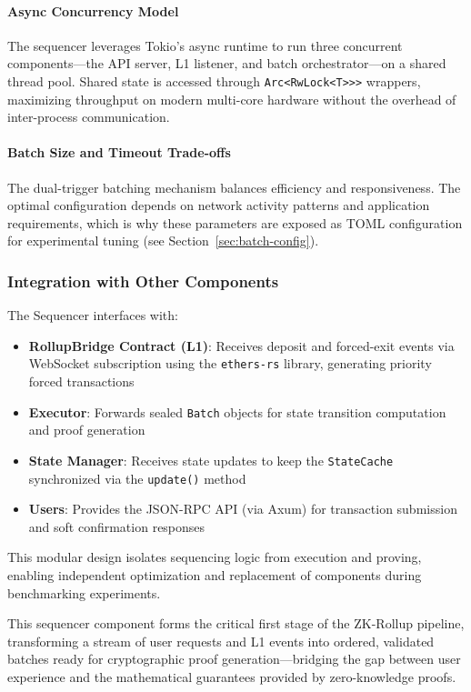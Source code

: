 \paragraph{Async Concurrency Model}

The sequencer leverages Tokio's async runtime to run three concurrent components---the API server, L1 listener, and batch orchestrator---on a shared thread pool. Shared state is accessed through \texttt{Arc<RwLock<T>{>}{>}} wrappers, maximizing throughput on modern multi-core hardware without the overhead of inter-process communication.

\paragraph{Batch Size and Timeout Trade-offs}

The dual-trigger batching mechanism balances efficiency and responsiveness. The optimal configuration depends on network activity patterns and application requirements, which is why these parameters are exposed as TOML configuration for experimental tuning (see Section~\ref{sec:batch-config}).

\subsubsection{Integration with Other Components}

The Sequencer interfaces with:

\begin{itemize}
    \item \textbf{RollupBridge Contract (L1)}: Receives deposit and forced-exit events via WebSocket subscription using the \texttt{ethers-rs} library, generating priority forced transactions
    \item \textbf{Executor}: Forwards sealed \texttt{Batch} objects for state transition computation and proof generation
    \item \textbf{State Manager}: Receives state updates to keep the \texttt{StateCache} synchronized via the \texttt{update()} method
    \item \textbf{Users}: Provides the JSON-RPC API (via Axum) for transaction submission and soft confirmation responses
\end{itemize}

This modular design isolates sequencing logic from execution and proving, enabling independent optimization and replacement of components during benchmarking experiments.


This sequencer component forms the critical first stage of the ZK-Rollup pipeline, transforming a stream of user requests and L1 events into ordered, validated batches ready for cryptographic proof generation---bridging the gap between user experience and the mathematical guarantees provided by zero-knowledge proofs.

